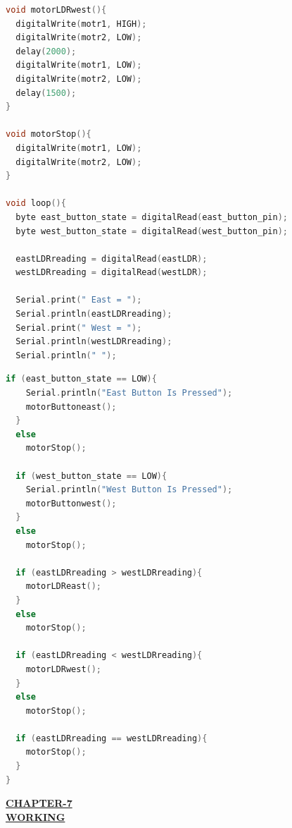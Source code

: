 \documentclass[12pt,a4paper]{article}
\begin{document}
\begin{lstlisting}[language=C++]
void motorLDRwest(){
  digitalWrite(motr1, HIGH); 
  digitalWrite(motr2, LOW); 
  delay(2000); 
  digitalWrite(motr1, LOW); 
  digitalWrite(motr2, LOW); 
  delay(1500);
}

void motorStop(){
  digitalWrite(motr1, LOW); 
  digitalWrite(motr2, LOW);
}

void loop(){
  byte east_button_state = digitalRead(east_button_pin); 
  byte west_button_state = digitalRead(west_button_pin);

  eastLDRreading = digitalRead(eastLDR); 
  westLDRreading = digitalRead(westLDR);

  Serial.print(" East = "); 
  Serial.println(eastLDRreading); 
  Serial.print(" West = "); 
  Serial.println(westLDRreading); 
  Serial.println(" ");
\end{lstlisting}
\clearpage




\begin{lstlisting}[language=C++]
  if (east_button_state == LOW){ 
    Serial.println("East Button Is Pressed"); 
    motorButtoneast(); 
  } 
  else 
    motorStop(); 

  if (west_button_state == LOW){ 
    Serial.println("West Button Is Pressed"); 
    motorButtonwest(); 
  } 
  else 
    motorStop(); 

  if (eastLDRreading > westLDRreading){ 
    motorLDReast(); 
  } 
  else 
    motorStop(); 

  if (eastLDRreading < westLDRreading){ 
    motorLDRwest(); 
  } 
  else 
    motorStop(); 

  if (eastLDRreading == westLDRreading){ 
    motorStop(); 
  } 
}
\end{lstlisting}
\clearpage




\begin{center}
  {\fontsize{15}{18}\selectfont \bfseries \textcolor{red!80!black}{\underline{CHAPTER-7}}}\\[2mm]
  {\fontsize{16}{20}\selectfont \bfseries \textcolor{red!80!black}{\underline{WORKING}}}\\[5mm]
\end{center}
\end{document}
